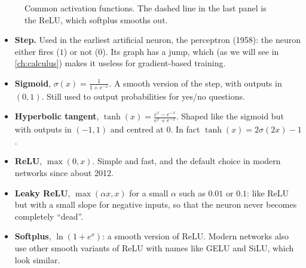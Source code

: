 \begin{figure}[htbp]
\centering
{}
\caption{Common activation functions. The dashed line in the last panel is
  the ReLU, which softplus smooths out.}
\label{fig:activations}
\end{figure}

\begin{itemize}
  \item \textbf{Step.} Used in the earliest artificial neuron, the perceptron
    (1958): the neuron either fires ($1$) or not ($0$). Its graph has a jump,
    which (as we will see in \cref{ch:calculus}) makes it useless for
    gradient-based training.
  \item \textbf{Sigmoid}, $\sigma(x) = \frac{1}{1 + e^{-x}}$. A smooth
    version of the step, with outputs in $(0, 1)$. Still used to output
    probabilities for yes/no questions.
  \item \textbf{Hyperbolic tangent},
    $\tanh(x) = \frac{e^x - e^{-x}}{e^x + e^{-x}}$. Shaped like the sigmoid but
    with outputs in $(-1, 1)$ and centred at $0$. In fact
    $\tanh(x) = 2\sigma(2x) - 1$.
  \item \textbf{ReLU}, $\max(0, x)$. Simple and fast, and the default choice in
    modern networks since about 2012.
  \item \textbf{Leaky ReLU}, $\max(\alpha x, x)$ for a small $\alpha$ such as
    $0.01$ or $0.1$: like ReLU but with a small slope for negative inputs, so
    that the neuron never becomes completely ``dead''.
  \item \textbf{Softplus}, $\ln(1 + e^x)$: a smooth version of ReLU. Modern
    networks also use other smooth variants of ReLU with names like GELU and
    SiLU, which look similar.
\end{itemize}

